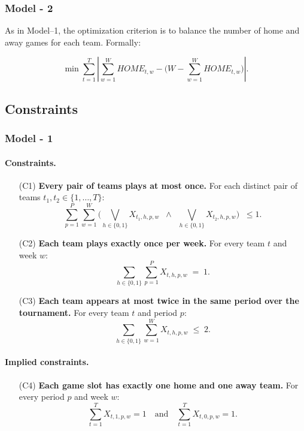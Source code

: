 \documentclass{article}
\begin{document}
\subsubsection{Model - 2 }

As in Model--1, the optimization criterion is to balance the number of
home and away games for each team. Formally:

\[
\min \sum_{t=1}^T \left| \sum_{w=1}^W HOME_{t,w}
      - \Big(W - \sum_{w=1}^W HOME_{t,w}\Big) \right|.
\]


\subsection{Constraints}

\subsubsection{Model - 1 }

\paragraph{Constraints.}

\begin{itemize}
\item[(C1)] \textbf{Every pair of teams plays at most once.}  
For each distinct pair of teams $t_1,t_2 \in \{1,\dots,T\}$:
\[
\sum_{p=1}^{P}\sum_{w=1}^{W}
\Big( \bigvee_{h\in\{0,1\}} X_{t_1,h,p,w} \;\;\land\;\;
       \bigvee_{h\in\{0,1\}} X_{t_2,h,p,w} \Big)
\;\;\leq 1.
\]

\item[(C2)] \textbf{Each team plays exactly once per week.}  
For every team $t$ and week $w$:
\[
\sum_{h\in\{0,1\}}\sum_{p=1}^{P} X_{t,h,p,w} \;=\; 1.
\]

\item[(C3)] \textbf{Each team appears at most twice in the same period over the tournament.}  
For every team $t$ and period $p$:
\[
\sum_{h\in\{0,1\}}\sum_{w=1}^{W} X_{t,h,p,w} \;\leq\; 2.
\]
\end{itemize}

\paragraph{Implied constraints.}

\begin{itemize}
\item[(C4)] \textbf{Each game slot has exactly one home and one away team.}  
For every period $p$ and week $w$:
\[
\sum_{t=1}^{T} X_{t,1,p,w} = 1
\quad\text{and}\quad
\sum_{t=1}^{T} X_{t,0,p,w} = 1.
\]
\end{itemize}
\end{document}
